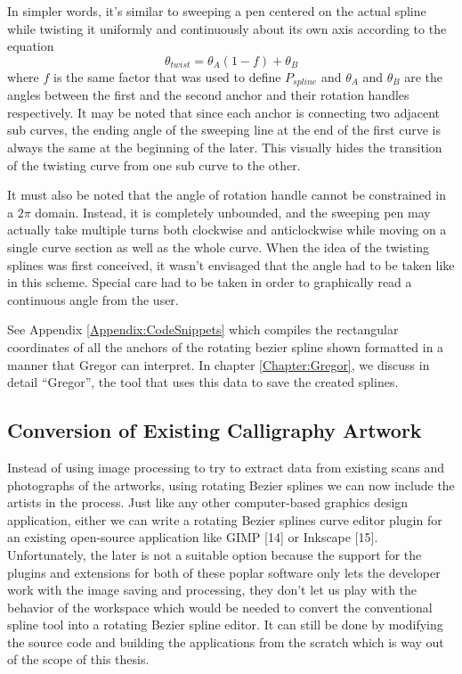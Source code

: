     In simpler words, it’s similar to sweeping a pen centered on the actual spline while twisting it uniformly and continuously about its own axis according to the equation
    \begin{equation}
    \theta_{twist}=\theta_A  (1-f)+ \theta_B
    \end{equation}
    where $f$ is the same factor that was used to define $P_{spline}$ and $\theta_A$ and $\theta_B$ are the angles between the first and the second anchor and their rotation handles respectively. It may be noted that since each anchor is connecting two adjacent sub curves, the ending angle of the sweeping line at the end of the first curve is always the same at the beginning of the later. This visually hides the transition of the twisting curve from one sub curve to the other.

    It must also be noted that the angle of rotation handle cannot be constrained in a $2\pi$ domain. Instead, it is completely unbounded, and the sweeping pen may actually take multiple turns both clockwise and anticlockwise while moving on a single curve section as well as the whole curve. When the idea of the twisting splines was first conceived, it wasn’t envisaged that the angle had to be taken like in this scheme. Special care had to be taken in order to graphically read a continuous angle from the user.

    See Appendix \ref{Appendix:CodeSnippets} which compiles the rectangular coordinates of all the anchors of the rotating bezier spline shown formatted in a manner that Gregor can interpret. In chapter \ref{Chapter:Gregor}, we discuss in detail ``Gregor'', the tool that uses this data to save the created splines.

\subsection{Conversion of Existing Calligraphy Artwork}
Instead of using image processing to try to extract data from existing scans and photographs of the artworks, using rotating Bezier splines we can now include the artists in the process. Just like any other computer-based graphics design application, either we can write a rotating Bezier splines curve editor plugin for an existing open-source application like GIMP [14] or Inkscape [15]. Unfortunately, the later is not a suitable option because the support for the plugins and extensions for both of these poplar software only lets the developer work with the image saving and processing, they don’t let us play with the behavior of the workspace which would be needed to convert the conventional spline tool into a rotating Bezier spline editor. It can still be done by modifying the source code and building the applications from the scratch which is way out of the scope of this thesis.

